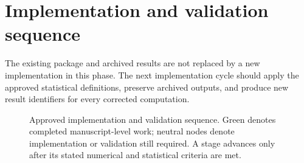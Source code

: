 \section{Implementation and validation sequence}
\label{sec:exec-implementation}

The existing package and archived results are not replaced by a new implementation in this phase. The next implementation cycle should apply the approved statistical definitions, preserve archived outputs, and produce new result identifiers for every corrected computation.

\begin{figure}[H]
  \centering
  \resizebox{0.98\textwidth}{!}{}
  \caption{Approved implementation and validation sequence. Green denotes completed manuscript-level work; neutral nodes denote implementation or validation still required. A stage advances only after its stated numerical and statistical criteria are met.}
  \label{fig:exec-implementation-sequence}
\end{figure}


